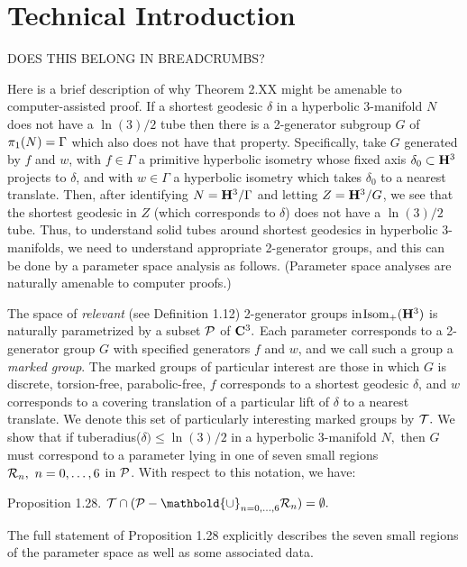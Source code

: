 \section{Technical Introduction}
DOES THIS BELONG IN BREADCRUMBS?

Here is a brief description of why Theorem 2.XX might be amenable to 
computer-assisted proof.
If a shortest geodesic $\delta$ in a hyperbolic $3$-manifold $N$ does not have 
a $\ln(3)/2$
tube then there is a 2-generator subgroup $G$ of $\pi_1(N)\break =\Gamma$ which 
also does not have that property.
Specifically, take 
$G$ generated by $f$ and $w$, with $f\in \Gamma$ a primitive
hyperbolic isometry
whose fixed axis $\delta_0 \subset {\bf H}^3$ projects to $\delta$, and 
with $w\in \Gamma$ a hyperbolic isometry
which takes $\delta_0$ to a nearest translate.
Then, after identifying $N={\bf H}^3/\Gamma$ and letting 
$Z={\bf H}^3/G$,
we see that the shortest geodesic in $Z$ (which corresponds to $\delta$)
does not have 
a $\ln(3)/2$ tube. 
Thus, to understand solid tubes around shortest geodesics in hyperbolic 
$3$-manifolds, we need to understand appropriate 2-generator groups, and this 
can be done by a parameter space analysis as follows.  (Parameter space 
analyses are naturally amenable to 
computer proofs.)

The space of {\it relevant} (see Definition 1.12) 2-generator groups 
in\break ${\rm Isom}_+({\bf H}^3)$ is naturally
parametrized by a subset ${\cal P}$ of ${\bf C}^3.$  
Each parameter corresponds to a
2-generator group $G$ with specified generators $f$ and $w$, and we call 
such a group a {\it marked group}. 
The marked groups of particular interest are those in which $G$ is
discrete, torsion-free, parabolic-free, $f$ corresponds to a shortest
geodesic $\delta$, and $w$ corresponds to a
covering translation of a particular lift of
$\delta$ to a nearest translate.  
We denote this set of particularly interesting marked groups by ${\cal T}.$
We show that if tuberadius($\delta) \le \ln(3)/2$ 
in a hyperbolic $3$-manifold $N,$ then 
$G$ must correspond to a parameter lying in one of seven small regions
${\cal R}_n,\ n=0,\ldots,6$ 
in ${\cal P}$.  
With respect to this notation, we have:

 {\elevensc Proposition 1.28}.
${\cal T} \cap ({\cal P} - \mathbold{\cup}_{n=0,\ldots,6}{\cal R}_n) = \emptyset.$
\vfill

The full statement of Proposition 1.28 explicitly describes the seven small
regions of the parameter space as well as some associated data.


